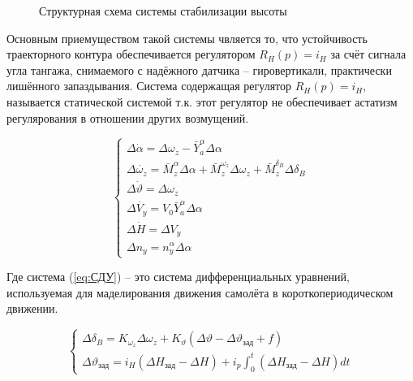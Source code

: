 \documentclass[a4paper,12pt]{article}
\begin{document}
\begin{figure}[H]
    \caption{Структурная схема системы стабилизации высоты}
    \label{fig:2}
\end{figure}

Основным приемуществом такой системы чвляется то, что устойчивость траекторного контура обеспечивается 
регулятором $R_H(p)=i_H$ за счёт сигнала угла тангажа, снимаемого с надёжного датчика -- гировертикали, практически лишённого запаздывания.
Система содержащая регулятор $R_H(p)=i_H$, называется статической системой т.к. этот регулятор не обеспечивает астатизм регулярования в отношении других возмущений. 


\begin{equation}
    \begin{cases}
        \Delta\dot{\alpha}=\Delta\omega_z-\bar{Y}^\alpha_a\Delta\alpha\\
        \Delta\dot{\omega_z} = \bar{M}^\alpha_z\Delta\alpha+\bar{M}^{\omega_z}_z\Delta\omega_z+\bar{M}^{\delta_B}_z\Delta\delta_B\\
        \Delta\dot{\vartheta} = \Delta\omega_z\\
        \Delta\dot{V_y}=V_0\bar{Y}^\alpha_a\Delta\alpha\\
        \Delta\dot{H}=\Delta V_y\\
        \Delta n_y=n^\alpha_y\Delta\alpha
    \end{cases}
    \label{eq:СДУ}
\end{equation}

Где система (\ref{eq:СДУ}) -- это система дифференциальных уравнений, используемая для маделирования
движения самолёта в короткопериодическом движении. 

\begin{equation}
    \begin{cases}
        \Delta\delta_B=K_{\omega_z}\Delta\omega_z+K_{\vartheta}(\Delta\vartheta-\Delta\vartheta_\text{зад}+f)\\
        \Delta\vartheta_{\text{зад}} = i_H(\Delta H_{\text{зад}}-\Delta H)+i_p\int_{0}^{t}(\Delta H_{\text{зад}}-\Delta H)dt
    \end{cases}
    \label{eq:заданные значения}
\end{equation}
\end{document}
